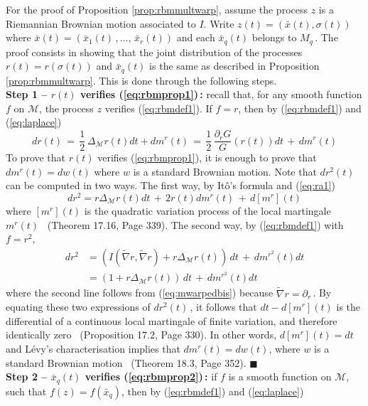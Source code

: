 \documentclass{svmult}
\begin{document}
For the proof of Proposition \ref{prop:rbmmultwarp}, assume the process $z$ is a Riemannian Brownian motion associated to $I$. Write $z(t) = (\bar{x}(t),\sigma(t))$ where $\bar{x}(t) = \left(\bar{x}_1(t)\,,\ldots,\,\bar{x}_r(t)\right)$  and each $\bar{x}_q(t)$ belongs to $M_q\,$. The proof consists in showing that the joint distribution of the processes $r(t) = r(\sigma(t))$ and $\bar{x}_q(t)$ is the same as described in Proposition \ref{prop:rbmmultwarp}. This is done through the following steps. \\[0.1cm]
\textbf{Step 1 -- $r(t)$ verifies (\ref{eq:rbmprop1})\,:} recall that, for any smooth function $f$ on $\mathcal{M}$, the process $z$ verifies (\ref{eq:rbmdef1}).
If $f = r$, then by (\ref{eq:rbmdef1}) and (\ref{eq:laplace})
\begin{equation} \label{eq:ra1}
  dr(t) \,=\, \frac{1}{2}\,\Delta_{\mathcal{M}}r(t)dt + dm^r(t) \,=\, \frac{1}{2}\,\frac{\partial_rG}{G}(r(t))dt\,+\,dm^r(t)
\end{equation}
To prove that $r(t)$ verifies (\ref{eq:rbmprop1}), it is enough to prove that $dm^r(t) = dw(t)$ where $w$ is a standard Brownian motion. Note that 
$dr^2(t)$ can be computed in two ways. The first way, by It\^o's formula and (\ref{eq:ra1})
$$
dr^2 = r\Delta_{\mathcal{M}}r(t)dt \,+\, 2r(t)dm^r(t)\,+\,d[m^r](t) 
$$
where $[m^r](t)$ is the quadratic variation process of the local martingale $m^r(t)$~\cite{kallenberg} (Theorem 17.16, Page 339). The second way, by (\ref{eq:rbmdef1}) with $f = r^2$,
$$
\begin{array}{rl}
dr^2 &= \left(I(\tilde{\nabla}r,\tilde{\nabla}r)+r\Delta_{\mathcal{M}}r(t)\right)\,dt \,+\,dm^{r^2}(t)dt \\[0.3cm]
        &= \left(1+r\Delta_{\mathcal{M}}r(t)\right)\,dt \,+\,dm^{r^2}(t)dt
\end{array}
$$
where the second line follows from (\ref{eq:mwarpedbis}) because $\tilde{\nabla}r = \partial_r$\,. By equating these two expressions of $dr^2(t)$\,, it follows that $dt - d[m^r](t)$ is the differential of a continuous local martingale of finite variation, and therefore identically zero~\cite{kallenberg} (Proposition 17.2, Page 330). In other words, $d[m^r](t) = dt$ and L\'evy's characterisation implies that $dm^r(t) = dw(t)$, where $w$ is a standard Brownian motion~\cite{kallenberg} (Theorem 18.3, Page 352). \hfill$\blacksquare$ \\[0.1cm]
\textbf{Step 2 -- $\bar{x}_q(t)$ verifies (\ref{eq:rbmprop2})\,:} if $f$ is a smooth function on $\mathcal{M}$, such that $f(z) = f(\bar{x}_q)$, then by (\ref{eq:rbmdef1}) and (\ref{eq:laplace})
\end{document}
